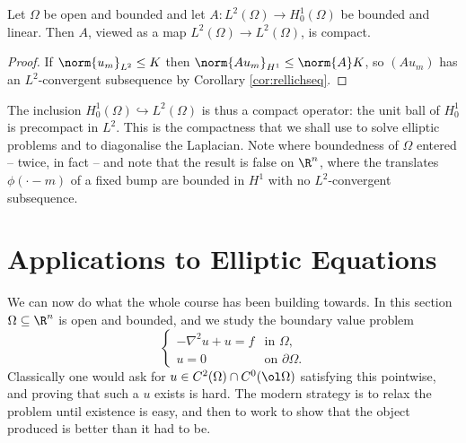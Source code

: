 \begin{corollary}\label{cor:compactop}
	Let $\Omega$ be open and bounded and let $A : L^2(\Omega)\to H_0^1(\Omega)$ be bounded and linear. Then $A$, viewed as a map $L^2(\Omega)\to L^2(\Omega)$, is compact.
\end{corollary}

\begin{proof}
	If $\norm{u_m}_{L^2}\le K$ then $\norm{Au_m}_{H^1}\le\norm{A}K$, so $(Au_m)$ has an $L^2$-convergent subsequence by Corollary \ref{cor:rellichseq}.
\end{proof}

The inclusion $H_0^1(\Omega)\hookrightarrow L^2(\Omega)$ is thus a compact operator: the unit ball of $H_0^1$ is precompact in $L^2$. This is the compactness that we shall use to solve elliptic problems and to diagonalise the Laplacian. Note where boundedness of $\Omega$ entered -- twice, in fact -- and note that the result is false on $\R^n$, where the translates $\phi(\cdot - m)$ of a fixed bump are bounded in $H^1$ with no $L^2$-convergent subsequence.

\section{Applications to Elliptic Equations}\label{sec:pde}

We can now do what the whole course has been building towards. In this section $\Omega\subseteq\R^n$ is open and bounded, and we study the boundary value problem
$$\begin{cases} -\nabla^2u+u=f & \text{in }\Omega,\\ u = 0 & \text{on }\partial\Omega.\end{cases}$$
Classically one would ask for $u \in C^2(\Omega)\cap C^0(\ol\Omega)$ satisfying this pointwise, and proving that such a $u$ exists is hard. The modern strategy is to relax the problem until existence is easy, and then to work to show that the object produced is better than it had to be.

\begin{center}
\end{center}

